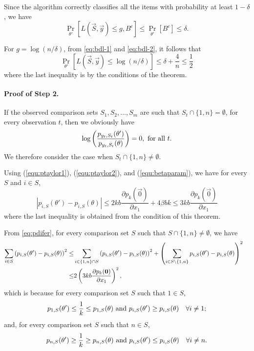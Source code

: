 Since the algorithm correctly classifies all the items with probability at least $1-\delta$, we have 
\begin{equation}
\Pr_{\theta'}[L(\vec{S},\vec{y}) \le g,B^c] \le \Pr_{\theta'}[B^c] \le \delta.
\label{eq:bdl-2}
\end{equation}

For $g = \log(n/\delta)$, from \eqref{eq:bdl-1} and \eqref{eq:bdl-2}, it follows that
$$
\Pr_{\theta'}[L(\vec{S},\vec{y}) \le \log(n/\delta)] \le \delta + \frac{4}{n} \leq \frac{1}{2}
$$
where the last inequality is by the conditions of the theorem.

\paragraph{Proof of Step 2.} If the observed comparison sets $S_1,S_2,\ldots,S_m$ are such that $S_t \cap \{1,n \} = \emptyset$, for every observation $t$, then we obviously have
$$
\log\left(\frac{p_{y_t,S_t}(\theta')}{p_{y_t,S_t}(\theta)}\right) = 0, \hbox{ for all } t.
$$
We therefore consider the case when $S_t \cap \{1,n \} \neq \emptyset$. 

Using (\ref{equ:ptaylor1}), (\ref{equ:ptaylor2}), and (\ref{equ:betaparam}), we have for every $S$ and $i\in S$,
\begin{equation}
|p_{i,S}(\theta')-p_{i,S}(\theta)| 
\le 2kb \frac{\partial p_k (\vec{0})}{\partial x_1} + 4 \beta bk
\le 3kb \frac{\partial p_k (\vec{0})}{\partial x_1} \label{eq:pdifer}
\end{equation}
where the last inequality is obtained from the condition of this theorem. 

From \eqref{eq:pdifer}, for every comparison set $S$ such that $S \cap \{1,n\} \neq \emptyset$, we have
\begin{align}
\sum_{i\in S}\left(p_{i,S}(\theta')-p_{i,S}(\theta)\right)^2 
\le& \sum_{i\in \{1,n \}\cap S}\left(p_{i,S}(\theta')-p_{i,S}(\theta)\right)^2 + 
\left(\sum_{i\in S\setminus \{1,n \} }p_{i,S}(\theta')-p_{i,S}(\theta)\right)^2 \cr
\le& 2\left(3kb \frac{\partial p_k (\vec{0})}{\partial x_1} \right)^2,
\label{eq:dsq}
\end{align}
which is because for every comparison set $S$ such that $1 \in S$,
$$
p_{1,S}(\theta') \le \frac{1}{k} \le p_{1,S}(\theta) \hbox{ and } 
p_{i,S}(\theta') \ge p_{i,S}(\theta)\quad \forall i \neq 1;
$$
and, for every comparison set $S$ such that $n\in S$,
$$
p_{n,S}(\theta') \ge \frac{1}{k} \ge p_{n,S}(\theta) \hbox{ and }
p_{i,S}(\theta') \le p_{i,S}(\theta)\quad\forall i \neq n.
$$

